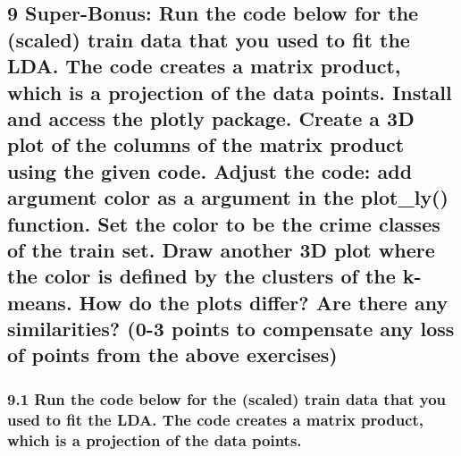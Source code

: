 \documentclass[
]{article}
\begin{document}
\hypertarget{super-bonus-run-the-code-below-for-the-scaled-train-data-that-you-used-to-fit-the-lda.-the-code-creates-a-matrix-product-which-is-a-projection-of-the-data-points.-install-and-access-the-plotly-package.-create-a-3d-plot-of-the-columns-of-the-matrix-product-using-the-given-code.-adjust-the-code-add-argument-color-as-a-argument-in-the-plot_ly-function.-set-the-color-to-be-the-crime-classes-of-the-train-set.-draw-another-3d-plot-where-the-color-is-defined-by-the-clusters-of-the-k-means.-how-do-the-plots-differ-are-there-any-similarities-0-3-points-to-compensate-any-loss-of-points-from-the-above-exercises}{%
\subsection{9 Super-Bonus: Run the code below for the (scaled) train
data that you used to fit the LDA. The code creates a matrix product,
which is a projection of the data points. Install and access the plotly
package. Create a 3D plot of the columns of the matrix product using the
given code. Adjust the code: add argument color as a argument in the
plot\_ly() function. Set the color to be the crime classes of the train
set. Draw another 3D plot where the color is defined by the clusters of
the k-means. How do the plots differ? Are there any similarities? (0-3
points to compensate any loss of points from the above
exercises)}\label{super-bonus-run-the-code-below-for-the-scaled-train-data-that-you-used-to-fit-the-lda.-the-code-creates-a-matrix-product-which-is-a-projection-of-the-data-points.-install-and-access-the-plotly-package.-create-a-3d-plot-of-the-columns-of-the-matrix-product-using-the-given-code.-adjust-the-code-add-argument-color-as-a-argument-in-the-plot_ly-function.-set-the-color-to-be-the-crime-classes-of-the-train-set.-draw-another-3d-plot-where-the-color-is-defined-by-the-clusters-of-the-k-means.-how-do-the-plots-differ-are-there-any-similarities-0-3-points-to-compensate-any-loss-of-points-from-the-above-exercises}}

\hypertarget{run-the-code-below-for-the-scaled-train-data-that-you-used-to-fit-the-lda.-the-code-creates-a-matrix-product-which-is-a-projection-of-the-data-points.}{%
\subsubsection{9.1 Run the code below for the (scaled) train data that
you used to fit the LDA. The code creates a matrix product, which is a
projection of the data
points.}\label{run-the-code-below-for-the-scaled-train-data-that-you-used-to-fit-the-lda.-the-code-creates-a-matrix-product-which-is-a-projection-of-the-data-points.}}
\end{document}
